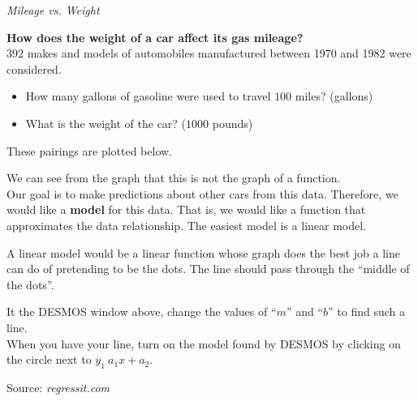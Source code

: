 \documentclass{ximera}
\begin{document}
\begin{model} \textit{Mileage vs. Weight}

\textbf{How does the weight of a car affect its gas mileage?} \\



$392$ makes and models of automobiles manufactured between 1970 and 1982 were considered.  

\begin{itemize}
\item How many gallons of gasoline were used to travel $100$ miles?   (gallons)
\item What is the weight of the car?    ($1000$ pounds)
\end{itemize}


These pairings are plotted below.




\begin{center}
\end{center}


We can see from the graph that this is not the graph of a function.  \\


Our goal is to make predictions about other cars from this data.  Therefore, we would like a \textbf{model} for this data.  That is, we would like a function that approximates the data relationship.  The easiest model is a linear model.


A linear model would be a linear function whose graph does the best job a line can do of pretending to be the dots.  The line should pass through the ``middle of the dots''.

It the DESMOS window above, change the values of ``$m$'' and ``$b$'' to find such a line. \\

When you have your line, turn on the model found by DESMOS by clicking on the circle next to $y_1 ~ a_1 x + a_2$.


Source:   \textit{regressit.com}
\end{model}



\end{document}
